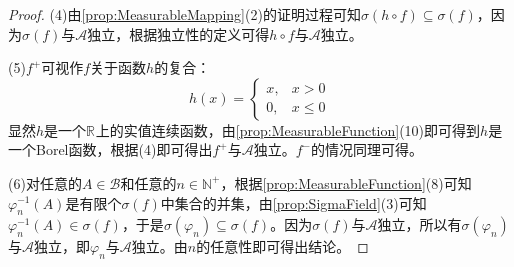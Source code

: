 \begin{proof}
	(4)由\cref{prop:MeasurableMapping}(2)的证明过程可知$\sigma(h\circ f)\subseteq\sigma(f)$，因为$\sigma(f)$与$\mathscr{A}$独立，根据独立性的定义可得$h\circ f$与$\mathscr{A}$独立。\par
	(5)$f^+$可视作$f$关于函数$h$的复合：
	\begin{equation*}
		h(x)=
		\begin{cases}
			x,&x>0 \\
			0,&x\leqslant0
		\end{cases}
	\end{equation*}
	显然$h$是一个$\mathbb{R}^{}$上的实值连续函数，由\cref{prop:MeasurableFunction}(10)即可得到$h$是一个Borel函数，根据(4)即可得出$f^+$与$\mathscr{A}$独立。$f^-$的情况同理可得。\par
	(6)对任意的$A\in\mathcal{B}$和任意的$n\in\mathbb{N}^+$，根据\cref{prop:MeasurableFunction}(8)可知$\varphi_n^{-1}(A)$是有限个$\sigma(f)$中集合的并集，由\cref{prop:SigmaField}(3)可知$\varphi_n^{-1}(A)\in\sigma(f)$，于是$\sigma(\varphi_n)\subseteq\sigma(f)$。因为$\sigma(f)$与$\mathscr{A}$独立，所以有$\sigma(\varphi_n)$与$\mathscr{A}$独立，即$\varphi_n$与$\mathscr{A}$独立。由$n$的任意性即可得出结论。
\end{proof}










